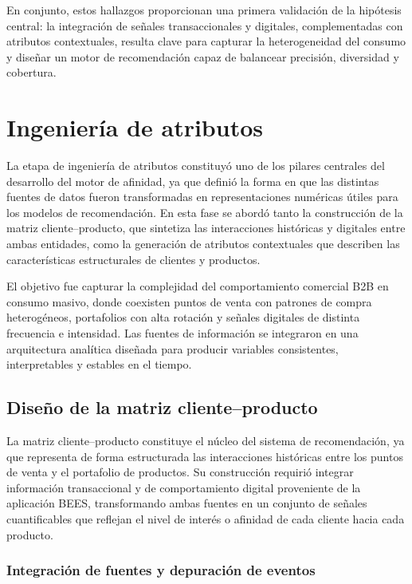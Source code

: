 En conjunto, estos hallazgos proporcionan una primera validación de la hipótesis central: la integración de señales transaccionales y digitales, complementadas con atributos contextuales, resulta clave para capturar la heterogeneidad del consumo y diseñar un motor de recomendación capaz de balancear precisión, diversidad y cobertura.


\section{Ingeniería de atributos}

La etapa de ingeniería de atributos constituyó uno de los pilares centrales del desarrollo del motor de afinidad, ya que definió la forma en que las distintas fuentes de datos fueron transformadas en representaciones numéricas útiles para los modelos de recomendación. En esta fase se abordó tanto la construcción de la matriz cliente–producto, que sintetiza las interacciones históricas y digitales entre ambas entidades, como la generación de atributos contextuales que describen las características estructurales de clientes y productos.

El objetivo fue capturar la complejidad del comportamiento comercial B2B en consumo masivo, donde coexisten puntos de venta con patrones de compra heterogéneos, portafolios con alta rotación y señales digitales de distinta frecuencia e intensidad. Las fuentes de información se integraron en una arquitectura analítica diseñada para producir variables consistentes, interpretables y estables en el tiempo.

\subsection{Diseño de la matriz cliente–producto}

La matriz cliente–producto constituye el núcleo del sistema de recomendación, ya que representa de forma estructurada las interacciones históricas entre los puntos de venta y el portafolio de productos. Su construcción requirió integrar información transaccional y de comportamiento digital proveniente de la aplicación BEES, transformando ambas fuentes en un conjunto de señales cuantificables que reflejan el nivel de interés o afinidad de cada cliente hacia cada producto.

\subsubsection{Integración de fuentes y depuración de eventos}

